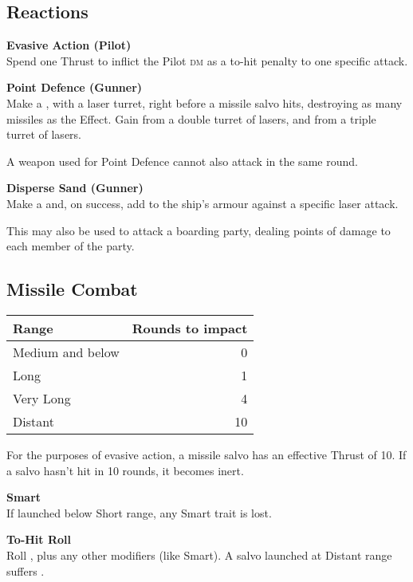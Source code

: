 \documentclass{cheatsheet}
\begin{document}
\begin{multicols}{3}
\subsection{Reactions}

\textbf{Evasive Action (Pilot)}\\
Spend one Thrust to inflict the Pilot \textsc{dm} as a to-hit penalty
to one specific attack.

\textbf{Point Defence (Gunner)}\\
Make a , with a laser turret,
right before a missile salvo hits, destroying as many missiles as the
Effect.  Gain  from a double turret of lasers, and
 from a triple turret of lasers.

A weapon used for Point Defence cannot also attack in the same round.

\textbf{Disperse Sand (Gunner)}\\
Make a  and, on success, add
 to the ship's armour against a specific laser
attack.

This may also be used to attack a boarding party, dealing 
points of damage to each member of the party.

\subsection{Missile Combat}

\begin{tabularx}{\linewidth}{Xr} \toprule
  Range & Rounds to impact \\ \midrule
  Medium and below & 0 \\
  Long & 1 \\
  Very Long & 4 \\
  Distant & 10 \\ \bottomrule
\end{tabularx}

For the purposes of evasive action, a missile salvo has an effective
Thrust of 10.  If a salvo hasn't hit in 10 rounds, it becomes inert.

\textbf{Smart}\\
If launched below Short range, any Smart trait is lost.

\textbf{To-Hit Roll}\\
Roll , plus any other modifiers (like Smart).
A salvo launched at Distant range suffers .


\end{multicols}
\end{document}
